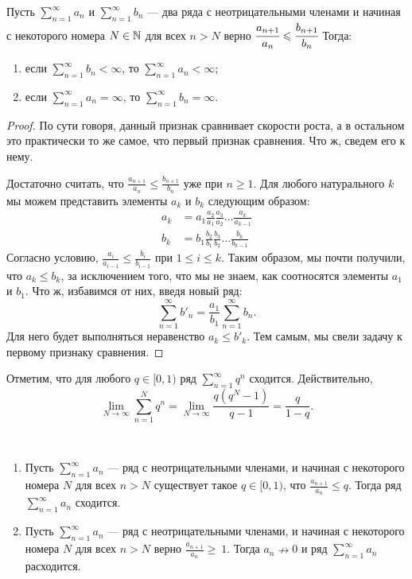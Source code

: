 \documentclass[a4paper, 12pt]{article}
\begin{document}
\begin{Test}
	Пусть $\sum\limits_{n=1}^{\infty} a_n$ и $\sum\limits_{n=1}^{\infty} b_n$ --- два ряда с неотрицательными членами и начиная с некоторого номера $N\in\mathbb{N}$ для всех $n>N$ верно $\cfrac{a_{n+1}}{a_n} \leqslant \cfrac{b_{n+1}}{b_n}$ Тогда: \begin{enumerate}
		\item если $\sum\limits_{n=1}^{\infty} b_n < \infty$, то $\sum\limits_{n=1}^{\infty} a_n < \infty$;
		\item если $\sum\limits_{n=1}^{\infty} a_n = \infty$, то $\sum\limits_{n=1}^{\infty} b_n = \infty$. 
	\end{enumerate}
\end{Test}
\begin{proof}
	По сути говоря, данный признак сравнивает скорости роста, а в остальном это практически то же самое, что первый признак сравнения. Что ж, сведем его к нему.
	
	Достаточно считать, что $\frac{a_{n+1}}{a_n} \leqslant \frac{b_{n+1}}{b_n}$ уже при $n \ge 1$. Для любого натурального $k$ мы можем представить элементы $a_k$ и $b_k$ следующим образом:
	\begin{align*}
	a_k &= a_1 \frac{a_2}{a_1}\frac{a_3}{a_2} \ldots \frac{a_k}{a_{k-1}} \\
	b_k &= b_1 \frac{b_2}{b_1}\frac{b_3}{b_2} \ldots \frac{b_k}{b_{k-1}}
	\end{align*}
	Согласно условию, $\frac{a_{i}}{a_{i-1}} \le \frac{b_i}{b_{i-1}}$ при $1 \le i \le k$. Таким образом, мы почти получили, что $a_k \le b_k$, за исключением того, что мы не знаем, как соотносятся элементы $a_1$ и $b_1$. Что ж, избавимся от них, введя новый ряд:
	$$
	\sum\limits_{n=1}^{\infty} b'_n = \frac{a_1}{b_1}\sum\limits_{n=1}^{\infty}b_n.
	$$ 
	Для него будет выполняться неравенство $a_k \le b'_k$. Тем самым, мы свели задачу к первому признаку сравнения.
\end{proof}

\begin{Comment}
	Отметим, что для любого $q \in [0,1)$ ряд $\sum\limits_{n=1}^{\infty} q^n$ сходится. Действительно, $$\lim\limits_{N\rightarrow\infty} \sum\limits_{n=1}^{N} q^n=\lim\limits_{N\rightarrow\infty}\frac{q(q^N-1)}{q-1} = \frac{q}{1-q}.$$
\end{Comment}

\begin{Test}\
		\begin{enumerate}
		\item 	Пусть $\sum\limits_{n=1}^{\infty} a_n$ --- ряд с неотрицательными членами, и начиная с некоторого номера $N$ для всех $n>N$ существует такое $q \in [0, 1)$, что $\frac{a_{n+1}}{a_n} \leqslant q$. Тогда ряд $\sum\limits_{n=1}^{\infty} a_n$ сходится.
		\item Пусть $\sum\limits_{n=1}^{\infty} a_n$ --- ряд с неотрицательными членами, и начиная с некоторого номера $N$ для всех $n>N$ верно $\frac{a_{n+1}}{a_n} \geqslant~1$. Тогда $a_n \nrightarrow 0$ и ряд $\sum\limits_{n=1}^{\infty} a_n$ расходится.
	\end{enumerate}
\end{Test}
\end{document}
